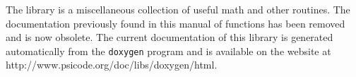 The  library is a miscellaneous collection of useful
math and other routines.  The documentation previously found in this
manual of  functions has been removed and is now obsolete.
The current documentation of this library is generated automatically from
the {\tt doxygen} program and is available on the website at \\
{http://www.psicode.org/doc/libs/doxygen/html}.

